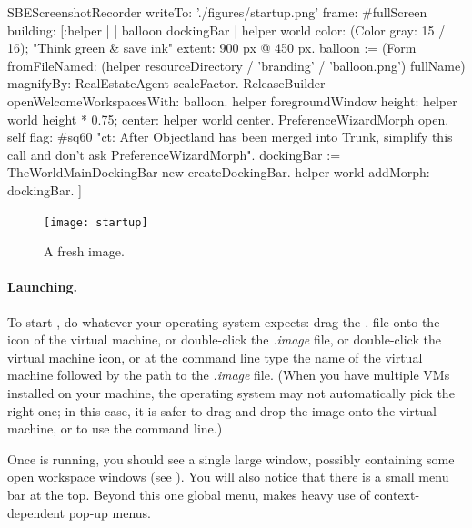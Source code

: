 \documentclass[a4paper,10pt,twoside]{book}
\begin{document}
\begin{ExecuteSmalltalkScript}
SBEScreenshotRecorder writeTo: './figures/startup.png' frame: #fullScreen building: [:helper |
	| balloon dockingBar |
	helper world
		color: (Color gray: 15 / 16); "Think green & save ink"
		extent: 900 px @ 450 px.
	balloon := (Form fromFileNamed: (helper resourceDirectory
		/ 'branding' / 'balloon.png') fullName)
			magnifyBy: RealEstateAgent scaleFactor.
	ReleaseBuilder openWelcomeWorkspacesWith: balloon.
	helper foregroundWindow
		height: helper world height * 0.75;
		center: helper world center.
	PreferenceWizardMorph open.
	self flag: #sq60 "ct: After Objectland has been merged into Trunk, simplify this call and don't ask PreferenceWizardMorph".
	dockingBar := TheWorldMainDockingBar new createDockingBar.
	helper world addMorph: dockingBar.
]
\end{ExecuteSmalltalkScript}
\begin{figure}[htb]
\centerline {\texttt{[image: startup]}}
\caption{A fresh \sq image.\label{fig:startup}}
\end{figure}

\paragraph{Launching.} To start \sq, do whatever your operating system expects: drag the \emph{.} file onto the icon of the virtual machine, or double-click the \emph{.image} file, or double-click the virtual machine icon, or at the command line type the name of the virtual machine followed by the path to the \emph{.image} file.
(When you have multiple VMs installed on your machine, the operating system may not automatically pick the right one; in this case, it is safer to drag and drop the image onto the virtual machine, or to use the command line.)

Once \sq is running, you should see a single large window, possibly containing some open workspace windows (see ).
You will also notice that there is a small menu bar at the top.
Beyond this one global menu, \sq makes heavy use of context-dependent pop-up menus.

\end{document}
